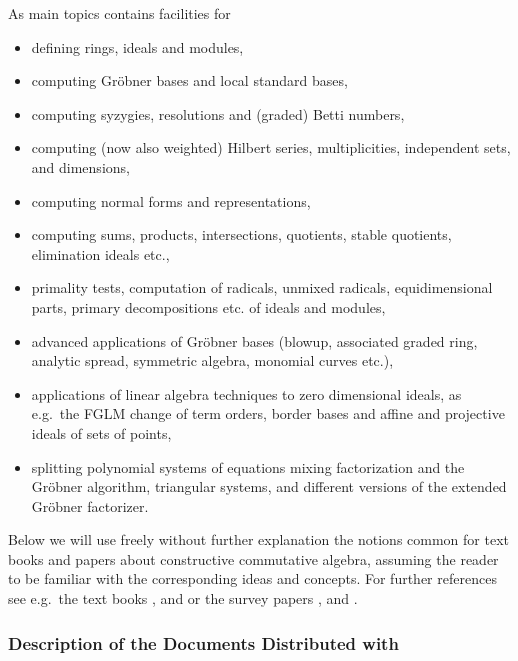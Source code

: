 As main topics  contains facilities for
\begin{itemize}
\item defining rings, ideals and modules,

\item computing Gr\"obner bases and local standard bases,

\item computing syzygies, resolutions and (graded) Betti numbers,

\item computing (now also weighted) Hilbert series, multiplicities,
independent sets, and dimensions,

\item computing normal forms and representations,

\item computing sums, products, intersections, quotients, stable
quotients, elimination ideals etc.,

\item primality tests, computation of radicals, unmixed radicals,
equidimensional parts, primary decompositions etc. of ideals and
modules,

\item advanced applications of Gr\"obner bases (blowup, associated graded
ring, analytic spread, symmetric algebra, monomial curves etc.),

\item applications of linear algebra techniques to zero dimensional
	ideals, as e.g.\ the FGLM change of term orders, border bases
	and affine and projective ideals of sets of points,

\item splitting polynomial systems of equations mixing factorization and
the Gr\"obner algorithm, triangular systems, and different versions of the
extended Gr\"obner factorizer.

\end{itemize}

Below we will use freely without further explanation the notions
common for text books and papers about constructive commutative
algebra, assuming the reader to be familiar with the corresponding
ideas and concepts. For further references see e.g.\ the text books
\cite{Becker:93}, \cite{Cox:92} and \cite{Mishra:93} or the survey papers
\cite{Buchberger:85}, \cite{Buchberger:88} and \cite{Robbiano:89}.

\subsubsection{Description of the Documents Distributed with }

